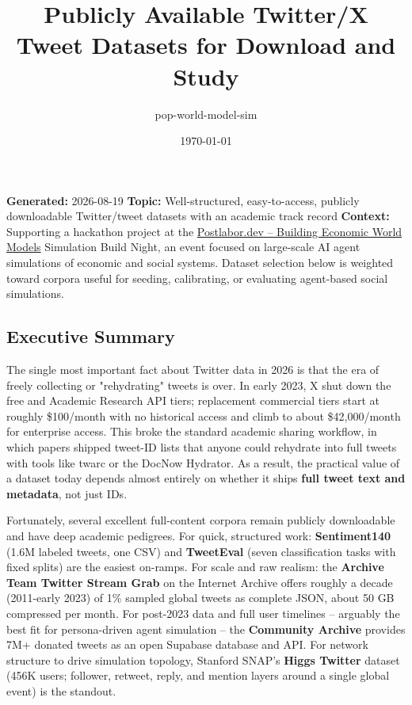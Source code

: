 \documentclass[twocolumn,10pt,letterpaper]{article}
\title{\vspace{-1.8em}\LARGE\bfseries\color{titlebg} Publicly Available Twitter/X Tweet Datasets for Download and Study\vspace{-0.3em}}
\author{pop-world-model-sim}
\date{{\small\color{headergray} \today}}
\begin{document}
\maketitle
\thispagestyle{firstpage}
\vspace{-0.5em}


\textbf{Generated:} 2026-08-19 \textbf{Topic:} Well-structured, easy-to-access, publicly downloadable Twitter/tweet datasets with an academic track record \textbf{Context:} Supporting a hackathon project at the \href{https://luma.com/th01qwp1}{Postlabor.dev -- Building Economic World Models} Simulation Build Night, an event focused on large-scale AI agent simulations of economic and social systems. Dataset selection below is weighted toward corpora useful for seeding, calibrating, or evaluating agent-based social simulations.


\subsection{Executive Summary}

The single most important fact about Twitter data in 2026 is that the era of freely collecting or "rehydrating" tweets is over. In early 2023, X shut down the free and Academic Research API tiers; replacement commercial tiers start at roughly \$100/month with no historical access and climb to about \$42,000/month for enterprise access. This broke the standard academic sharing workflow, in which papers shipped tweet-ID lists that anyone could rehydrate into full tweets with tools like twarc or the DocNow Hydrator. As a result, the practical value of a dataset today depends almost entirely on whether it ships \textbf{full tweet text and metadata}, not just IDs.


Fortunately, several excellent full-content corpora remain publicly downloadable and have deep academic pedigrees. For quick, structured work: \textbf{Sentiment140} (1.6M labeled tweets, one CSV) and \textbf{TweetEval} (seven classification tasks with fixed splits) are the easiest on-ramps. For scale and raw realism: the \textbf{Archive Team Twitter Stream Grab} on the Internet Archive offers roughly a decade (2011-early 2023) of 1\% sampled global tweets as complete JSON, about 50 GB compressed per month. For post-2023 data and full user timelines -- arguably the best fit for persona-driven agent simulation -- the \textbf{Community Archive} provides 7M+ donated tweets as an open Supabase database and API. For network structure to drive simulation topology, Stanford SNAP's \textbf{Higgs Twitter} dataset (456K users; follower, retweet, reply, and mention layers around a single global event) is the standout.
\end{document}
